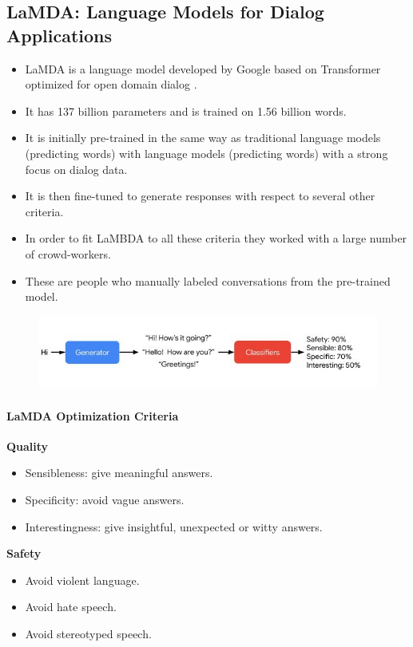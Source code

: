 \subsection{LaMDA: Language Models for Dialog Applications}
\begin{itemize}
\item LaMDA is a language model developed by Google based on Transformer optimized for open domain dialog \cite{thoppilan2022lamda}.
\item It has 137 billion parameters and is trained on 1.56 billion words.
\item It is initially pre-trained in the same way as traditional language models (predicting words) with language models (predicting words) with a strong focus on dialog data.
\item It is then ﬁne-tuned to generate responses with respect to several other criteria.
\item In order to fit LaMBDA to all these criteria they worked with a large number of crowd-workers.
\item These are people who manually labeled conversations from the pre-trained model.
\end{itemize}


 \begin{figure}[h]
        	\includegraphics[scale = 0.5]{pics/lambda.png}
        \end{figure}


\paragraph{LaMDA Optimization Criteria}
\textbf{Quality}
\begin{itemize}
\item Sensibleness: give meaningful answers.
\item Specificity: avoid vague answers.
\item Interestingness: give insightful, unexpected or witty answers.
\end{itemize}

\textbf{Safety}
\begin{itemize}
\item Avoid violent language.
\item Avoid hate speech.
\item Avoid stereotyped speech.
\end{itemize}

